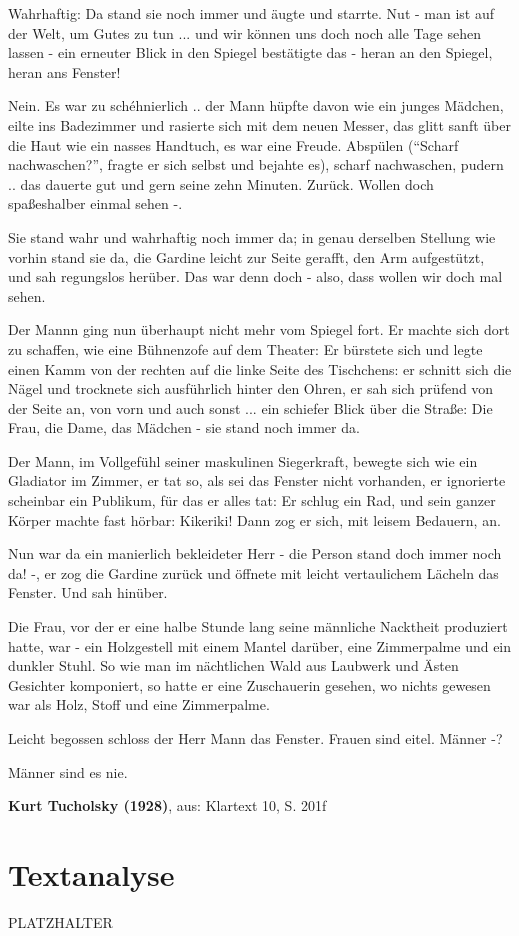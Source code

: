 \documentclass[12pt,a4paper]{scrartcl}
\begin{document}
\begin{linenumbers}
Wahrhaftig: Da stand sie noch immer und äugte und starrte. Nut - man ist auf der Welt, um Gutes zu tun ... und wir können uns doch noch alle Tage sehen lassen - ein erneuter Blick in den Spiegel bestätigte das - heran an den Spiegel, heran ans Fenster!

Nein. Es war zu schéhnierlich .. der Mann hüpfte davon wie ein junges Mädchen, eilte ins Badezimmer und rasierte sich mit dem neuen Messer, das glitt sanft über die Haut wie ein nasses Handtuch, es war eine Freude. Abspülen ("`Scharf nachwaschen?"', fragte er sich selbst und bejahte es), scharf nachwaschen, pudern .. das dauerte gut und gern seine zehn Minuten. Zurück. Wollen doch spaßeshalber einmal sehen -.

Sie stand wahr und wahrhaftig noch immer da; in genau derselben Stellung wie vorhin stand sie da, die Gardine leicht zur Seite gerafft, den Arm aufgestützt, und sah regungslos herüber. Das war denn doch - also, dass wollen wir doch mal sehen. 

Der Mannn ging nun überhaupt nicht mehr vom Spiegel fort. Er machte sich dort zu schaffen, wie eine Bühnenzofe auf dem Theater: Er bürstete sich und legte einen Kamm von der rechten auf die linke Seite des Tischchens: er schnitt sich die Nägel und trocknete sich ausführlich hinter den Ohren, er sah sich prüfend von der Seite an, von vorn und auch sonst ... ein schiefer Blick über die Straße: Die Frau, die Dame, das Mädchen - sie stand noch immer da.

Der Mann, im Vollgefühl seiner maskulinen Siegerkraft, bewegte sich wie ein Gladiator im Zimmer, er tat so, als sei das Fenster nicht vorhanden, er ignorierte scheinbar ein Publikum, für das er alles tat: Er schlug ein Rad, und sein ganzer Körper machte fast hörbar: Kikeriki! Dann zog er sich, mit leisem Bedauern, an.

Nun war da ein manierlich bekleideter Herr - die Person stand doch immer noch da! -, er zog die Gardine zurück und öffnete mit leicht vertaulichem Lächeln das Fenster. Und sah hinüber.


Die Frau, vor der er eine halbe Stunde lang seine männliche Nacktheit produziert hatte, war - ein Holzgestell mit einem Mantel darüber, eine Zimmerpalme und ein dunkler Stuhl. So wie man im nächtlichen Wald aus Laubwerk und Ästen Gesichter komponiert, so hatte er eine Zuschauerin gesehen, wo nichts gewesen war als Holz, Stoff und eine Zimmerpalme.

Leicht begossen schloss der Herr Mann das Fenster. Frauen sind eitel. Männer -?

Männer sind es nie.\\
\end{linenumbers}
\textbf{Kurt Tucholsky (1928)}, aus: Klartext 10, S. 201f
%
\section{Textanalyse}
\begin{spacing}{2}
PLATZHALTER


\end{spacing}
\end{document}

